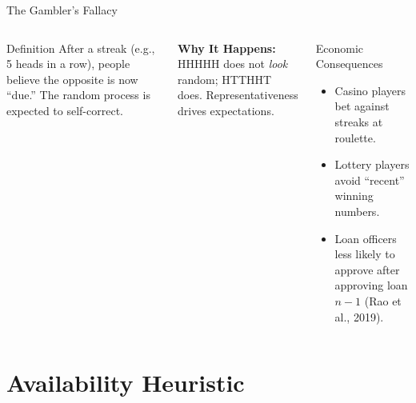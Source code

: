 \documentclass[aspectratio=169]{beamer}
\begin{document}
\begin{frame}{The Gambler's Fallacy}
\begin{columns}
\begin{block}{Definition}
After a streak (e.g., 5 heads in a row), people believe the opposite is now ``due.'' The random process is expected to \alert{self-correct}.
\end{block}
\textcolor{beteal}{\textbf{Why It Happens:}} HHHHH does not \textit{look} random; HTTHHT does. Representativeness drives expectations.
\begin{alertblock}{Economic Consequences}
\begin{itemize}\small
  \item Casino players bet against streaks at roulette.
  \item Lottery players avoid ``recent'' winning numbers.
  \item Loan officers less likely to approve after approving loan $n-1$ (Rao et al., 2019).
\end{itemize}
\end{alertblock}
\end{columns}
\end{frame}

\section{Availability Heuristic}
\end{document}
